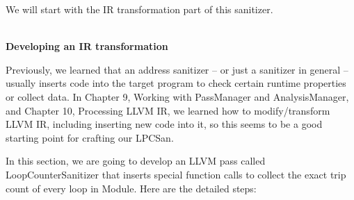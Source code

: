 We will start with the IR transformation part of this sanitizer.


\hspace*{\fill} \\ %
\noindent
\textbf{Developing an IR transformation}

Previously, we learned that an address sanitizer – or just a sanitizer in general – usually inserts code into the target program to check certain runtime properties or collect data. In Chapter 9, Working with PassManager and AnalysisManager, and Chapter 10, Processing LLVM IR, we learned how to modify/transform LLVM IR, including inserting new code into it, so this seems to be a good starting point for crafting our LPCSan. 

In this section, we are going to develop an LLVM pass called LoopCounterSanitizer that inserts special function calls to collect the exact trip count of every loop in Module. Here are the detailed steps:

